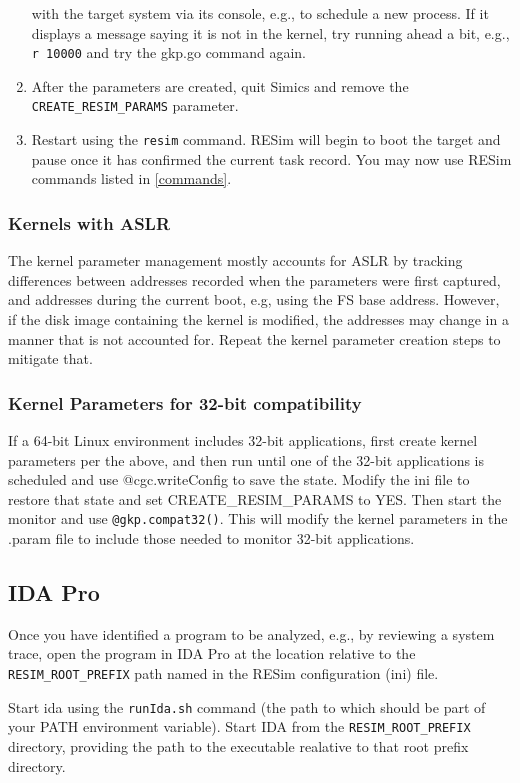 \documentclass[titlepage]{article}
\begin{document}
\begin{enumerate}
with the target system via its console, e.g., to schedule a new process.  If it displays a message saying it is not in the kernel,
try running ahead a bit, e.g., {\tt r 10000} and try the gkp.go command again.
\item After the parameters are created, quit Simics and remove the {\tt CREATE\_RESIM\_PARAMS} parameter.
\item Restart using the {\tt resim} command.  RESim will begin to boot the target and pause once it has confirmed the current task record.  You
may now use RESim commands listed in \ref{commands}.
\end{enumerate}

\subsubsection{Kernels with ASLR}
The kernel parameter management mostly accounts for ASLR by tracking differences between addresses recorded when the parameters were first
captured, and addresses during the current boot, e.g, using the FS base address.  However, if the disk image containing the kernel is modified,
the addresses may change in a manner that is not accounted for.  Repeat the kernel parameter creation steps to mitigate that.

\subsubsection{Kernel Parameters for 32-bit compatibility}
If a 64-bit Linux environment includes 32-bit applications, first create kernel parameters per the above, and then run until one of the 32-bit applications
is scheduled and use @cgc.writeConfig to save
the state.  Modify the ini file to restore that state and set CREATE\_RESIM\_PARAMS to YES.  Then start the monitor and use
{\tt @gkp.compat32()}.  This will modify the kernel parameters in the .param file to include those needed to monitor 32-bit applications.

\subsection{IDA Pro}
\label{ida}
Once you have identified a program to be analyzed, e.g., by reviewing a system trace, open the program in IDA Pro at the location relative to the 
{\tt RESIM\_ROOT\_PREFIX} path named in the RESim configuration (ini) file.  

Start ida using the {\tt runIda.sh} command (the path to which should be part of your PATH environment variable).  Start IDA from the
{\tt RESIM\_ROOT\_PREFIX} directory, providing the path to the executable realative to that root prefix directory.
\end{document}
